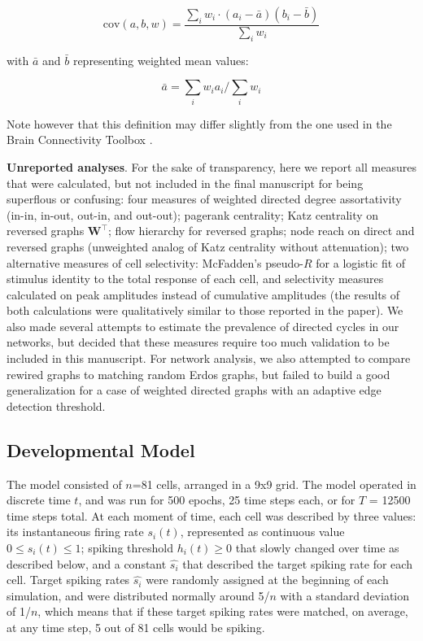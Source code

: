 \documentclass{article}
\begin{document}
\[ \text{cov}(a,b,w) = \frac{\sum_i{w_i \cdot (a_i-\bar{a})(b_i-\bar{b})}}{\sum_i{w_i}} \]

with $\bar{a}$ and $\bar{b}$ representing weighted mean values: 

\[ \bar{a}=\sum_i{w_i a_i}/\sum_i{w_i} \]

Note however that this definition may differ slightly from the one used in the Brain Connectivity Toolbox \citep{rubinov2010toolbox}.

\textbf{Unreported analyses}. For the sake of transparency, here we report all measures that were calculated, but not included in the final manuscript for being superflous or confusing: four measures of weighted directed degree assortativity (in-in, in-out, out-in, and out-out); pagerank centrality; Katz centrality on reversed graphs $\mathbf{W}^\top$; flow hierarchy for reversed graphs; node reach on direct and reversed graphs (unweighted analog of Katz centrality without attenuation); two alternative measures of cell selectivity: McFadden’s pseudo-$R$ for a logistic fit of stimulus identity to the total response of each cell, and selectivity measures calculated on peak amplitudes instead of cumulative amplitudes (the results of both calculations were qualitatively similar to those reported in the paper). We also made several attempts to estimate the prevalence of directed cycles in our networks, but decided that these measures require too much validation to be included in this manuscript. For network analysis, we also attempted to compare rewired graphs to matching random Erdos graphs, but failed to build a good generalization for a case of weighted directed graphs with an adaptive edge detection threshold.

\subsection*{Developmental Model}

The model consisted of $n$=81 cells, arranged in a 9x9 grid. The model operated in discrete time $t$, and was run for 500 epochs, 25 time steps each, or for $T$ = 12500 time steps total. At each moment of time, each cell was described by three values: its instantaneous firing rate $s_i(t)$, represented as continuous value $0 \leqslant s_i(t) \leqslant 1$; spiking threshold $h_i(t) \geqslant 0$ that slowly changed over time as described below, and a constant $\hat{s_i}$ that described the target spiking rate for each cell. Target spiking rates $\hat{s_i}$ were randomly assigned at the beginning of each simulation, and were distributed normally around 5/$n$ with a standard deviation of 1/$n$, which means that if these target spiking rates were matched, on average, at any time step, 5 out of 81 cells would be spiking.
\end{document}
